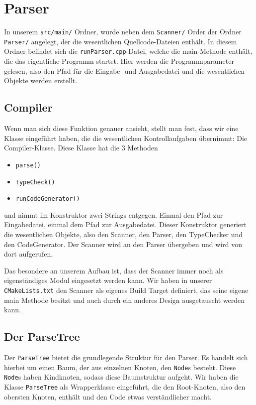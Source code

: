 \chapter{Parser}\label{chap:Parser}

In unserem \texttt{src/main/} Ordner, wurde neben dem \texttt{Scanner/} Order der Ordner \texttt{Parser/} angelegt, der die wesentlichen Quellcode-Dateien enthält. In diesem Ordner befindet sich die \texttt{runParser.cpp}-Datei, welche die main-Methode enthält, die das eigentliche Programm startet. Hier werden die Programmparameter gelesen, also den Pfad für die Eingabe- und Ausgabedatei und die wesentlichen Objekte werden erstellt.

\section{Compiler}
Wenn man sich diese Funktion genauer ansieht, stellt man fest, dass wir eine Klasse eingeführt haben, die die wesentlichen Kontrollaufgaben übernimmt: Die Compiler-Klasse. Diese Klasse hat die 3 Methoden
\begin{itemize}
\item \texttt{parse()}
\item \texttt{typeCheck()}
\item \texttt{runCodeGenerator()}
\end{itemize}

und nimmt im Konstruktor zwei Strings entgegen. Einmal den Pfad zur Eingabedatei, einmal dem Pfad zur Ausgabedatei. Dieser Konstruktor generiert die wesentlichen Objekte, also den Scanner, den Parser, den TypeChecker und den CodeGenerator. Der Scanner wird an den Parser übergeben und wird von dort aufgerufen.

Das besondere an unserem Aufbau ist, dass der Scanner immer noch als eigenständiges Modul eingesetzt werden kann. Wir haben in unserer \texttt{CMakeLists.txt} den Scanner als eigenes Build Target definiert, das seine eigene main Methode besitzt und auch durch ein anderes Design ausgetauscht werden kann.

\section{Der ParseTree}
Der \texttt{ParseTree} bietet die grundlegende Struktur für den Parser. Es handelt sich hierbei um einen Baum, der aus einzelnen Knoten, den \texttt{Node}s besteht. Diese \texttt{Node}s haben Kindknoten, sodass diese Baumstruktur aufgeht. Wir haben die Klasse \texttt{ParseTree} als Wrapperklasse eingeführt, die den Root-Knoten, also den obersten Knoten, enthält und den Code etwas verständlicher macht.


